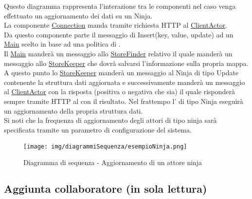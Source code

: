\documentclass{scalatekids-article}
\begin{document}
Questo diagramma rappresenta l'interazione tra le componenti nel caso venga
effettuato un aggiornamento dei dati su un  Ninja.\\
La componente \hyperref[sec:actorbase::driver::client::Connection]{Connection}
manda tramite richiesta HTTP al \hyperref[sec:actorbase::actorsystem::actors::clientactor::ClientActor]{ClientActor}.\\
Da questo componente parte il messaggio di Insert(key, value, update) ad un \hyperref[sec:actorbase::actorsystem::actors::main::Main]{Main}
scelto in base ad una politica di .\\
Il \hyperref[sec:actorbase::actorsystem::actors::main::Main]{Main} manderà un messaggio allo
\hyperref[sec:actorbase::actorsystem::actors::storefinder::Storefinder]{StoreFinder} relativo il quale manderà un messaggio
allo \hyperref[sec:actorbase::actorsystem::actors::storekeeper::Storekeeper]{StoreKeeper} che dovrà salvarsi l'informazione sulla propria mappa.\\
A questo punto lo \hyperref[sec:actorbase::actorsystem::actors::storekeeper::Storekeeper]{StoreKeeper} manderà un messaggio al Ninja di tipo
Update contenente la struttura dati aggiornata e successivamente manderà un messaggio al
\hyperref[sec:actorbase::actorsystem::actors::clientactor::ClientActor]{ClientActor} con la risposta (positiva o negativa che sia)
il quale risponderà sempre tramite HTTP al  con il risultato.
Nel frattempo l' di tipo Ninja eseguirà un aggiornamento della propria struttura dati.\\
Si noti che la frequenza di aggiornamento degli attori di tipo ninja sarà
specificata tramite un parametro di configurazione del sistema.
\begin{figure}[H]
  \begin{center}
    \texttt{[image: img/diagrammiSequenza/esempioNinja.png]}
    \caption{Diagramma di sequenza - Aggiornamento di un attore ninja}
  \end{center}
\end{figure}

\subsection{Aggiunta collaboratore (in sola lettura)}
\end{document}
